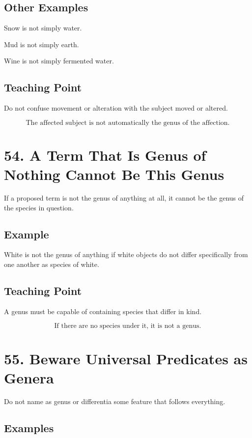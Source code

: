 \documentclass[12pt]{article}
\begin{document}
\subsection*{Other Examples}

Snow is not simply water.

Mud is not simply earth.

Wine is not simply fermented water.

\subsection*{Teaching Point}

Do not confuse movement or alteration with the subject moved or altered.

\[
\boxed{
\text{The affected subject is not automatically the genus of the affection.}
}
\]

\section*{54. A Term That Is Genus of Nothing Cannot Be This Genus}

If a proposed term is not the genus of anything at all, it cannot be the genus
of the species in question.

\subsection*{Example}

White is not the genus of anything if white objects do not differ specifically
from one another as species of white.

\subsection*{Teaching Point}

A genus must be capable of containing species that differ in kind.

\[
\boxed{
\text{If there are no species under it, it is not a genus.}
}
\]

\section*{55. Beware Universal Predicates as Genera}

Do not name as genus or differentia some feature that follows everything.

\subsection*{Examples}
\end{document}
